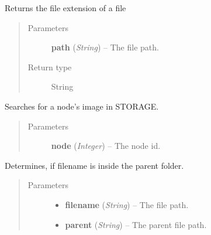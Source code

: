 \documentclass[letterpaper,10pt,english]{sphinxmanual}
\begin{document}

\begin{fulllineitems}
\label{filesystem:filesystem.get_file_extension}
Returns the file extension of a file
\begin{quote}\begin{description}
\item[{Parameters}] \leavevmode
\textbf{path} (\emph{String}) -- The file path.

\item[{Return type}] \leavevmode
String

\end{description}\end{quote}

\end{fulllineitems}


\begin{fulllineitems}
\label{filesystem:filesystem.get_node_image}
Searches for a node's image in STORAGE.
\begin{quote}\begin{description}
\item[{Parameters}] \leavevmode
\textbf{node} (\emph{Integer}) -- The node id.

\end{description}\end{quote}

\end{fulllineitems}


\begin{fulllineitems}
\label{filesystem:filesystem.is_subtree}
Determines, if filename is inside the parent folder.
\begin{quote}\begin{description}
\item[{Parameters}] \leavevmode\begin{itemize}
\item {} 
\textbf{filename} (\emph{String}) -- The file path.

\item {} 
\textbf{parent} (\emph{String}) -- The parent file path.

\end{itemize}

\end{description}\end{quote}

\end{fulllineitems}
\end{document}

